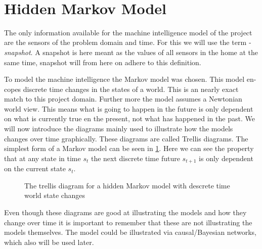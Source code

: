 ­\section{Hidden Markov Model}
The only information available for the machine intelligence model of the project are the sensors of the problem domain and time. For this we will use the term ­\emph{snapshot}. A snapshot is here meant as the values of all sensors in the home at the same time, snapshot will from here on adhere to this definition. 

To model the machine intelligence the Markov model was chosen. This model en-copes discrete time changes in the states of a world. This is an nearly exact match to this project domain. Further more the model assumes a Newtonian world view. This means what is going to happen in the future is only dependent on what is currently true en the present, not what has happened in the past. We will now introduce the diagrams mainly used to illustrate how the models changes over time graphically. These diagrams are called Trellis diagrams. The simplest form of a Markov model can be seen in \cref{fig:1stMarkovModel}. Here we can see the property that at any state in time $s_t$ the next discrete time future $s_{t+1}$ is only dependent on the current state $s_t$.

\begin{figure}[htbp]
\centering
{}
\caption[Trellis diagram for a simple Markov model]{The trellis diagram for a hidden Markov model with descrete time world state changes}\label{fig:1stMarkovModel}
\end{figure}
Even though these diagrams are good at illustrating the models and how they change over time it is important to remember that these are not illustrating the models themselves. The model could be illustrated via causal/Bayesian networks, which also will be used later.


